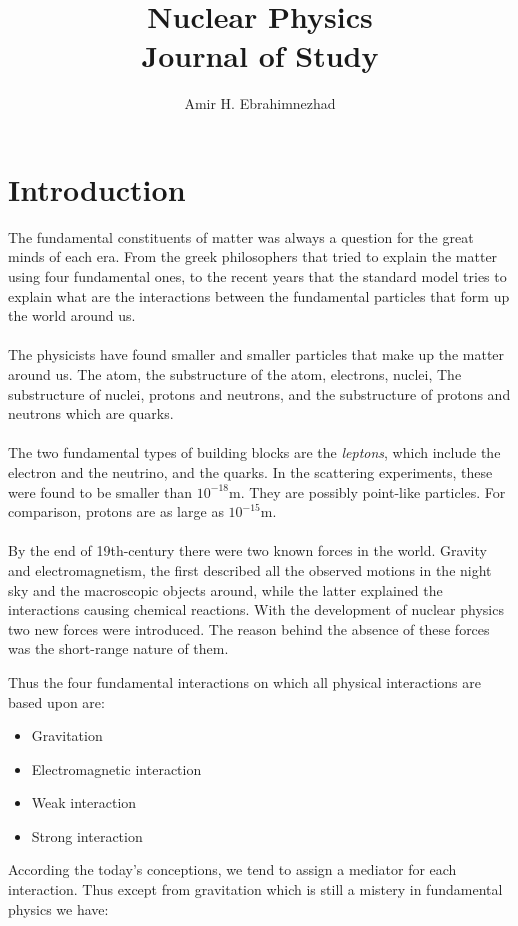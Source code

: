 \documentclass[10pt,a4paper]{article}
\title{Nuclear Physics \\ \large Journal of Study}
\author{Amir H. Ebrahimnezhad}
\begin{document}
    \maketitle

\newpage
\tableofcontents
\newpage
\section{Introduction}
The fundamental constituents of matter was always a question for the great minds of each era. From the greek philosophers that tried to explain the matter using four fundamental ones, to the recent years that the standard model tries to explain what are the interactions between the fundamental particles that form up the world around us.
\\
\\
The physicists have found smaller and smaller particles that make up the matter around us. The atom, the substructure of the atom, electrons, nuclei, The substructure of nuclei, protons and neutrons, and the substructure of protons and neutrons which are quarks. 
\\
\\
The two fundamental types of building blocks are the \textit{leptons}, which include the electron and the neutrino, and the quarks. In the scattering experiments, these were found to be smaller than $10^{-18}$m. They are possibly point-like particles.  For comparison, protons are as large as $10^{-15}$m. 
\\
\\
By the end of 19th-century there were two known forces in the world. Gravity and electromagnetism, the first described all the observed motions in the night sky and the macroscopic objects around, while the latter explained the interactions causing chemical reactions. With the development of nuclear physics two new forces were introduced. The reason behind the absence of these forces was the short-range nature of them.

Thus the four fundamental interactions on which all physical interactions are based upon are:
\begin{itemize}
     \item Gravitation
     \item Electromagnetic interaction
     \item Weak interaction
     \item Strong interaction
\end{itemize}

According the today's conceptions, we tend to assign a mediator for each interaction. Thus except from gravitation which is still a mistery in fundamental physics we have:
\end{document}
